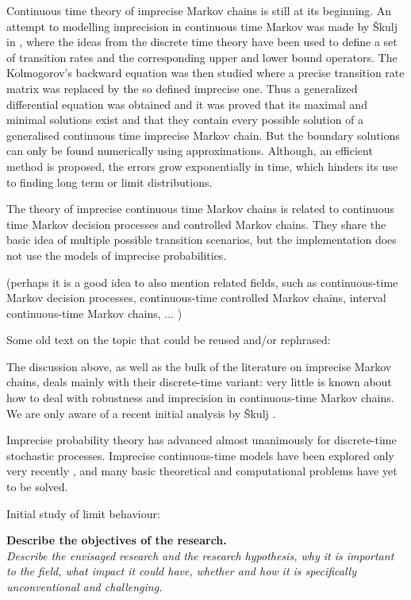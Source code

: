 \documentclass[11pt,dvipsnames,usenames,a4paper]{article}
\begin{document}
Continuous time theory of imprecise Markov chains is still at its beginning. An attempt to modelling imprecision in continuous time Markov was made by Škulj in \cite{skulj2015:continuous:bounds}, where the ideas from the discrete time theory have been used to define a set of transition rates and the corresponding upper and lower bound operators. The Kolmogorov's backward equation was then studied where a precise transition rate matrix was replaced by the so defined imprecise one. Thus a generalized differential equation was obtained and it was proved that its maximal and minimal solutions exist and that they contain every possible solution of a generalised continuous time imprecise Markov chain. But the boundary solutions can only be found numerically using approximations. Although, an efficient method is proposed, the errors grow exponentially in time, which hinders its use to finding long term or limit distributions.

The theory of imprecise continuous time Markov chains is related to continuous time Markov decision processes and controlled Markov chains. They share the basic idea of multiple possible transition scenarios, but the implementation does not use the models of imprecise probabilities. 


(perhaps it is a good idea to also mention related fields, such as continuous-time Markov decision processes, continuous-time controlled Markov chains, interval continuous-time Markov chains, ... )

{\color{Gray}
Some old text on the topic that could be reused and/or rephrased:

The discussion above, as well as the bulk of the literature on imprecise Markov chains, deals mainly with their discrete-time variant: very little is known about how to deal with robustness and imprecision in continuous-time Markov chains. 
We are only aware of a recent initial analysis by \v{S}kulj \cite{skulj2015:continuous:bounds}.

Imprecise probability theory has advanced almost unanimously for discrete-time stochastic processes.
Imprecise continuous-time models have been explored only very recently \cite{skulj2015:continuous:bounds,Troffaes+GSB-ISIPTA15p}, and many basic theoretical and computational problems have yet to be solved.

Initial study of limit behaviour: \cite{DeBock:2016:iCTMClimit}
}

\vspace{3mm}

\textbf{Describe the objectives of the research.}\\
\textit{Describe the envisaged research and the research hypothesis, why it is important to the field, what impact it could have, whether and how it is specifically unconventional and challenging.}
\end{document}
